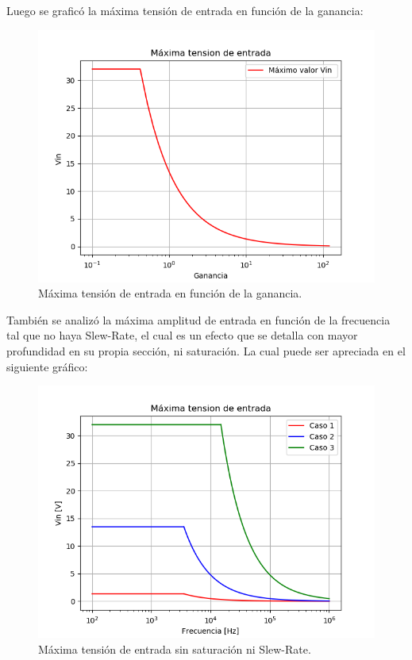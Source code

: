 Luego se graficó la máxima tensión de entrada en función de la ganancia:
\begin{figure}[H]	
	\centering
	\includegraphics[width=\textwidth]{Ejercicio1/Imagenes/maxvin.png}
	\caption{Máxima tensión de entrada en función de la ganancia.}
	\label{fig:MaxVin}
\end{figure} 

También se analizó la máxima amplitud de entrada en función de la frecuencia tal que no haya Slew-Rate, el cual es un efecto que se detalla con mayor profundidad en su propia sección, ni saturación.
La cual puede ser apreciada en el siguiente gráfico:
\begin{figure}[H]	
	\centering
	\includegraphics[width=\textwidth]{Ejercicio1/Imagenes/maxvinsr.png}
	\caption{Máxima tensión de entrada sin saturación ni Slew-Rate.}
	\label{fig:MaxVinsr}
\end{figure} 
